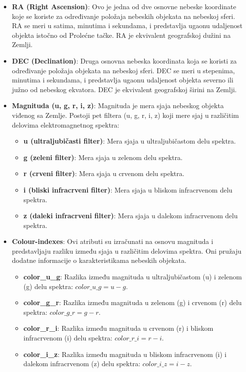 \documentclass[a4paper,12pt]{article}
\begin{document}
\begin{itemize}
    \item \textbf{RA (Right Ascension)}: Ovo je jedna od dve osnovne nebeske koordinate koje se koriste za određivanje položaja nebeskih objekata na nebeskoj sferi. RA se meri u satima, minutima i sekundama, i predstavlja ugaonu udaljenost objekta istočno od Prolećne tačke. RA je ekvivalent geografskoj dužini na Zemlji.
    
    \item \textbf{DEC (Declination)}: Druga osnovna nebeska koordinata koja se koristi za određivanje položaja objekata na nebeskoj sferi. DEC se meri u stepenima, minutima i sekundama, i predstavlja ugaonu udaljenost objekta severno ili južno od nebeskog ekvatora. DEC je ekvivalent geografskoj širini na Zemlji.
    
    \item \textbf{Magnituda (u, g, r, i, z)}: Magnituda je mera sjaja nebeskog objekta viđenog sa Zemlje. Postoji pet filtera (u, g, r, i, z) koji mere sjaj u različitim delovima elektromagnetnog spektra:
    \begin{itemize}
        \item \textbf{u (ultraljubičasti filter)}: Mera sjaja u ultraljubičastom delu spektra.
        \item \textbf{g (zeleni filter)}: Mera sjaja u zelenom delu spektra.
        \item \textbf{r (crveni filter)}: Mera sjaja u crvenom delu spektra.
        \item \textbf{i (bliski infracrveni filter)}: Mera sjaja u bliskom infracrvenom delu spektra.
        \item \textbf{z (daleki infracrveni filter)}: Mera sjaja u dalekom infracrvenom delu spektra.
    \end{itemize}

        \item \textbf{Colour-indexes}: Ovi atributi su izračunati na osnovu magnituda i predstavljaju razliku između sjaja u različitim delovima spektra. Oni pružaju dodatne informacije o karakteristikama nebeskih objekata.
    \begin{itemize}
        \item \textbf{color\_u\_g}: Razlika između magnituda u ultraljubičastom (u) i zelenom (g) delu spektra: $color\_u\_g = u - g$.
        \item \textbf{color\_g\_r}: Razlika između magnituda u zelenom (g) i crvenom (r) delu spektra: $color\_g\_r = g - r$.
        \item \textbf{color\_r\_i}: Razlika između magnituda u crvenom (r) i bliskom infracrvenom (i) delu spektra: $color\_r\_i = r - i$.
        \item \textbf{color\_i\_z}: Razlika između magnituda u bliskom infracrvenom (i) i dalekom infracrvenom (z) delu spektra: $color\_i\_z = i - z$.
    \end{itemize}
    

\end{itemize}
\end{document}
